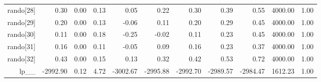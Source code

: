 \begin{table}[ht]
\begin{tabular}{rrrrrrrrrrr}
  rando[28] & 0.30 & 0.00 & 0.13 & 0.05 & 0.22 & 0.30 & 0.39 & 0.55 & 4000.00 & 1.00 \\ 
  rando[29] & 0.20 & 0.00 & 0.13 & -0.06 & 0.11 & 0.20 & 0.29 & 0.45 & 4000.00 & 1.00 \\ 
  rando[30] & 0.11 & 0.00 & 0.18 & -0.25 & -0.02 & 0.11 & 0.23 & 0.45 & 4000.00 & 1.00 \\ 
  rando[31] & 0.16 & 0.00 & 0.11 & -0.05 & 0.09 & 0.16 & 0.23 & 0.37 & 4000.00 & 1.00 \\ 
  rando[32] & 0.43 & 0.00 & 0.15 & 0.13 & 0.32 & 0.42 & 0.53 & 0.72 & 4000.00 & 1.00 \\ 
  lp\_\_ & -2992.90 & 0.12 & 4.72 & -3002.67 & -2995.88 & -2992.70 & -2989.57 & -2984.47 & 1612.23 & 1.00 \\ 
   \hline
\end{tabular}
\label{scalefit_tab}
\end{table}

